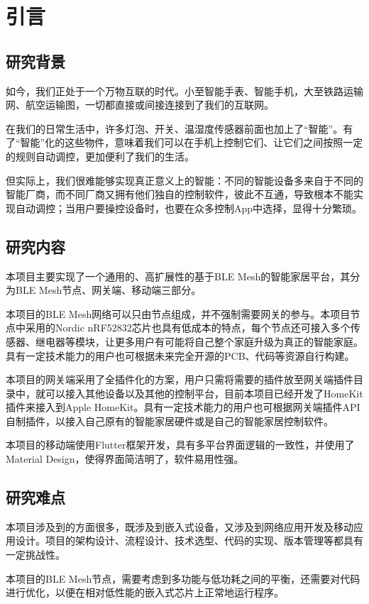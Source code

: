 \chapter{引言}

\section{研究背景}
如今，我们正处于一个万物互联的时代。小至智能手表、智能手机，大至铁路运输网、航空运输图，一切都直接或间接连接到了我们的互联网。

在我们的日常生活中，许多灯泡、开关、温湿度传感器前面也加上了“智能”。有了“智能”化的这些物件，意味着我们可以在手机上控制它们、让它们之间按照一定的规则自动调控，更加便利了我们的生活。

但实际上，我们很难能够实现真正意义上的智能：不同的智能设备多来自于不同的智能厂商，而不同厂商又拥有他们独自的控制软件，彼此不互通，导致根本不能实现自动调控；当用户要操控设备时，也要在众多控制App中选择，显得十分繁琐。

\section{研究内容}
本项目主要实现了一个通用的、高扩展性的基于BLE Mesh的智能家居平台，其分为BLE Mesh节点、网关端、移动端三部分。

本项目的BLE Mesh网络可以只由节点组成，并不强制需要网关的参与。本项目节点中采用的Nordic nRF52832芯片也具有低成本的特点，每个节点还可接入多个传感器、继电器等模块，让更多用户有可能将自己整个家庭升级为真正的智能家庭。具有一定技术能力的用户也可根据未来完全开源的PCB、代码等资源自行构建。

本项目的网关端采用了全插件化的方案，用户只需将需要的插件放至网关端插件目录中，就可以接入其他设备以及其他的控制平台，目前本项目已经开发了HomeKit插件来接入到Apple HomeKit。具有一定技术能力的用户也可根据网关端插件API自制插件，以接入自己原有的智能家居硬件或是自己的智能家居控制软件。

本项目的移动端使用Flutter框架开发，具有多平台界面逻辑的一致性，并使用了Material Design，使得界面简洁明了，软件易用性强。
\section{研究难点}
本项目涉及到的方面很多，既涉及到嵌入式设备，又涉及到网络应用开发及移动应用设计。项目的架构设计、流程设计、技术选型、代码的实现、版本管理等都具有一定挑战性。

本项目的BLE Mesh节点，需要考虑到多功能与低功耗之间的平衡，还需要对代码进行优化，以便在相对低性能的嵌入式芯片上正常地运行程序。

